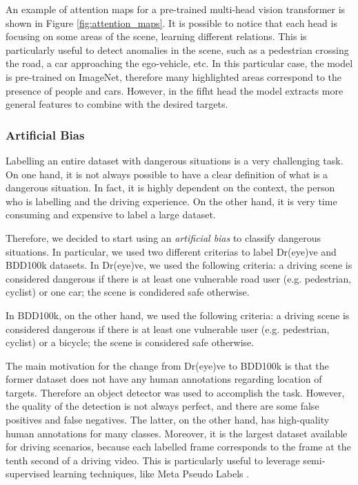 An example of attention maps for a pre-trained multi-head vision transformer is 
shown in Figure \ref{fig:attention_maps}.
It is possible to notice that each head is focusing on some areas of the 
scene, learning different relations. This is particularly useful to detect 
anomalies in the scene, such as a pedestrian crossing the road, a car approaching 
the ego-vehicle, etc. In this particular case, the model is pre-trained on 
ImageNet, therefore many highlighted areas correspond to the presence of 
people and cars. However, in the fifht head the model extracts more general 
features to combine with the desired targets.

\subsubsection{Artificial Bias}
Labelling an entire dataset with dangerous situations is a very challenging 
task. On one hand, it is not always possible to have a clear definition of what 
is a dangerous situation. In fact, it is highly dependent on the context, the 
person who is labelling and the driving experience. On the other hand, it is 
very time consuming and expensive to label a large dataset.

Therefore, we decided to start using an \emph{artificial bias} to classify 
dangerous situations. In particular, we used two different criterias to label 
Dr(eye)ve and BDD100k datasets. In Dr(eye)ve, we used the following criteria:
a driving scene is considered dangerous if there is at least one vulnerable 
road user (e.g. pedestrian, cyclist) or one car; the scene is condidered safe 
otherwise.

In BDD100k, on the other hand, we used the following criteria: a driving scene 
is considered dangerous if there is at least one vulnerable user (e.g. pedestrian, 
cyclist) or a bicycle; the scene is considered safe otherwise.

The main motivation for the change from Dr(eye)ve to BDD100k is that the former 
dataset does not have any human annotations regarding location of targets. 
Therefore an object detector was used to accomplish the task. However, the 
quality of the detection is not always perfect, and there are some false 
positives and false negatives.
The latter, on the other hand, has high-quality human annotations for many 
classes. Moreover, it is the largest dataset available for driving scenarios, 
because each labelled frame corresponds to the frame at the tenth second of 
a driving video. This is particularly useful to leverage semi-supervised learning 
techniques, like Meta Pseudo Labels \cite{pham2021meta}.

